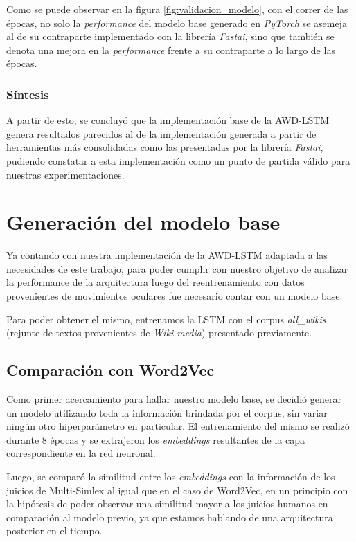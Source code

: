 Como se puede observar en la figura \ref{fig:validacion_modelo}, con el correr de las épocas, no solo la 
\textit{performance} del modelo base generado en \textit{PyTorch} se asemeja al de su contraparte 
implementado con la librería \textit{Fastai}, sino que también se denota una mejora en la 
\textit{performance} frente a su contraparte a lo largo de las épocas.

\subsubsection{Síntesis}

A partir de esto, se concluyó que la implementación base de la AWD-LSTM genera resultados 
parecidos al de la implementación generada a partir de herramientas más consolidadas 
como las presentadas por la librería \textit{Fastai}, pudiendo constatar a esta implementación 
como un punto de partida válido para nuestras experimentaciones.

\section{Generación del modelo base}

\label{sec:modelo_base}

Ya contando con nuestra implementación de la AWD-LSTM adaptada a las necesidades de este 
trabajo, para poder cumplir con nuestro objetivo de analizar la performance de la 
arquitectura luego del reentrenamiento con datos provenientes de movimientos oculares 
fue necesario contar con un modelo base.

Para poder obtener el mismo, entrenamos la LSTM con el corpus \textit{all\_wikis} (rejunte de textos 
provenientes de \textit{Wiki-media}) presentado previamente.

\subsection{Comparación con Word2Vec}

Como primer acercamiento para hallar nuestro modelo base, se decidió generar un modelo 
utilizando toda la información brindada por el corpus, sin variar ningún otro hiperparámetro 
en particular. El entrenamiento del mismo se realizó durante 8 épocas y se extrajeron los 
\textit{embeddings} resultantes de la capa correspondiente en la red neuronal.

Luego, se comparó la similitud entre los \textit{embeddings} con la información de los juicios de 
Multi-Simlex al igual que en el caso de Word2Vec, en un principio con la hipótesis de 
poder observar una similitud mayor a los juicios humanos en comparación al modelo previo, 
ya que estamos hablando de una arquitectura posterior en el tiempo.

